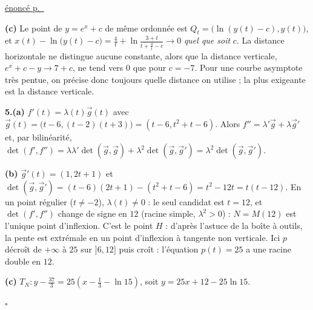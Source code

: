 \documentclass[a4paper,11pt]{article}
\numberwithin{equation}{section}
\numberwithin{figure}{section}
\numberwithin{table}{section}
\theoremstyle{enonce}
\theoremstyle{exemple}
\theoremstyle{remarque}
\newenvironment{corrige}[1]{%
  \par\needspace{6\baselineskip}\vspace{1em}\phantomsection\label{c:#1}%
  \noindent{\sffamily\bfseries\color{Bleu}Exercice~\ref{e:#1}}\quad
  {\scriptsize\sffamily\hyperref[e:#1]{\color{Gris}énoncé p.~\pageref{e:#1}}}\par\nobreak\vspace{0.2em}}%
  {\hfill\textcolor{BleuClair}{$\square$}\par}
\newcommand{\ve}[1]{\vec{#1}}
\begin{document}
\begin{corrige}{ds-pb}
\textbf{(c)} Le point de $y=e^x+c$ de même ordonnée est $Q_t=\big(\ln(y(t)-c),y(t)\big)$, et
$x(t)-\ln\big(y(t)-c\big)=\frac4t+\ln\frac{3+t}{t+\frac4t-c}\to0$ \emph{quel que soit} $c$. La distance horizontale ne
distingue aucune constante, alors que la distance verticale, $e^x+c-y\to7+c$, ne tend vers $0$ que pour $c=-7$. Pour une courbe
asymptote très pentue, on précise donc toujours quelle distance on utilise ; la plus exigeante est la distance verticale.

\textbf{5.(a)} $f'(t)=\lambda(t)\ve g(t)$ avec $\ve g(t)=\big(t-6,(t-2)(t+3)\big)=(t-6,t^2+t-6)$. Alors
$f''=\lambda'\ve g+\lambda\ve g'$ et, par bilinéarité, $\det(f',f'')=\lambda\lambda'\det(\ve g,\ve g)+\lambda^2\det(\ve g,\ve g')=\lambda^2\det(\ve g,\ve g')$.

\textbf{(b)} $\ve g'(t)=(1,2t+1)$ et $\det(\ve g,\ve g')=(t-6)(2t+1)-(t^2+t-6)=t^2-12t=t(t-12)$. En un point régulier
($t\neq-2$), $\lambda(t)\neq0$ : le seul candidat est $t=12$, et $\det(f',f'')$ change de signe en $12$ (racine simple, $\lambda^2>0$) :
$N=M(12)$ est l'unique point d'inflexion. C'est le point $H$ : d'après l'astuce de la boîte à outils, la pente est extrémale en un
point d'inflexion à tangente non verticale. Ici $p$ décroît de $+\infty$ à $25$ sur $]6,12]$ puis croît : l'équation $p(t)=25$ a une
racine double en $12$.

\textbf{(c)} $T_N:y-\frac{37}3=25\left(x-\frac13-\ln15\right)$, soit $y=25x+12-25\ln15$.


\end{corrige}
\end{document}
